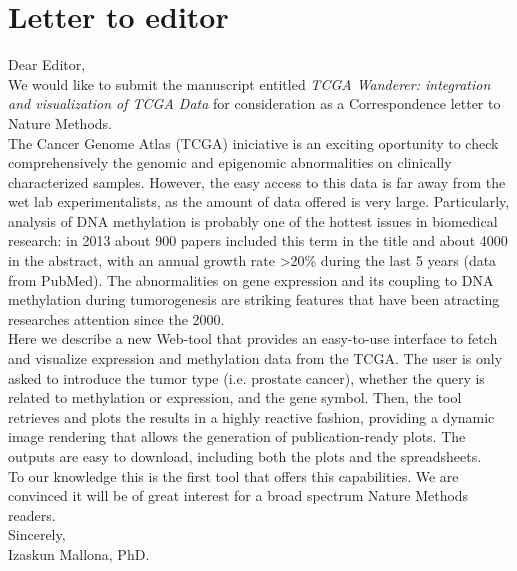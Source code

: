 \documentclass{article}
\begin{document}





\section{Letter to editor}


Dear Editor,\\

We would like to submit the manuscript entitled \textit{TCGA Wanderer: integration and visualization of TCGA Data} for consideration as a Correspondence letter to Nature Methods.\\

The Cancer Genome Atlas (TCGA) iniciative is an exciting oportunity to check comprehensively the genomic and epigenomic abnormalities on clinically characterized samples. However, the easy access to this data is far away from the wet lab experimentalists, as the amount of data offered is very large. Particularly, analysis of DNA methylation is probably one of the hottest issues in biomedical research: in 2013 about 900 papers included this term in the title and about 4000 in the abstract, with an annual growth rate >20\% during the last 5 years (data from PubMed). The abnormalities on gene expression and its coupling to DNA methylation during tumorogenesis are striking features that have been atracting researches attention since the 2000.\\

Here we describe a new Web-tool that provides an easy-to-use interface to fetch and visualize expression and methylation data from the TCGA. The user is only asked to introduce the tumor type (i.e. prostate cancer), whether the query is related to methylation or expression, and the gene symbol. Then, the tool retrieves and plots the results in a highly reactive fashion, providing a dynamic image rendering that allows the generation of publication-ready plots. The outputs are easy to download, including both the plots and the spreadsheets.\\

To our knowledge this is the first tool that offers this capabilities. We are convinced it will be of great interest for a broad spectrum Nature Methods readers.\\


Sincerely, \\
Izaskun Mallona, PhD.
\end{document}
